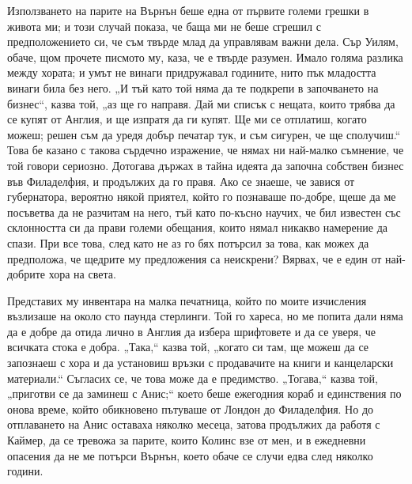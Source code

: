 \documentclass[12pt]{book}
\begin{document}
Използването на парите на Върнън беше една от първите големи грешки в живота ми; и този случай показа, че баща ми не беше сгрешил с предположението си, че съм твърде млад да управлявам важни дела. Сър Уилям, обаче, щом прочете писмото му, каза, че е твърде разумен. Имало голяма разлика между хората; и умът не винаги придружавал годините, нито пък младостта винаги била без него. „И тъй като той няма да те подкрепи в започването на бизнес“, казва той, „аз ще го направя. Дай ми списък с нещата, които трябва да се купят от Англия, и ще изпратя да ги купят. Ще ми се отплатиш, когато можеш; решен съм да уредя добър печатар тук, и съм сигурен, че ще сполучиш.“ Това бе казано с такова сърдечно изражение, че нямах ни най-малко съмнение, че той говори сериозно. Дотогава държах в тайна идеята да започна собствен бизнес във Филаделфия, и продължих да го правя. Ако се знаеше, че завися от губернатора, вероятно някой приятел, който го познаваше по-добре, щеше да ме посъветва да не разчитам на него, тъй като по-късно научих, че бил известен със склонността си да прави големи обещания, които нямал никакво намерение да спази. При все това, след като не аз го бях потърсил за това, как можех да предположа, че щедрите му предложения са неискрени? Вярвах, че е един от най-добрите хора на света.

Представих му инвентара на малка печатница, който по моите изчисления възлизаше на около сто паунда стерлинги. Той го хареса, но ме попита дали няма да е добре да отида лично в Англия да избера шрифтовете и да се уверя, че всичката стока е добра. „Така,“ казва той, „когато си там, ще можеш да се запознаеш с хора и да установиш връзки с продавачите на книги и канцеларски материали.“ Съгласих се, че това може да е предимство. „Тогава,“ казва той, „приготви се да заминеш с Анис;“ което беше ежегодния кораб и единствения по онова време, който обикновено пътуваше от Лондон до Филаделфия. Но до отплаването на Анис оставаха няколко месеца, затова продължих да работя с Каймер, да се тревожа за парите, които Колинс взе от мен, и в ежедневни опасения да не ме потърси Върнън, което обаче се случи едва след няколко години.
\end{document}
